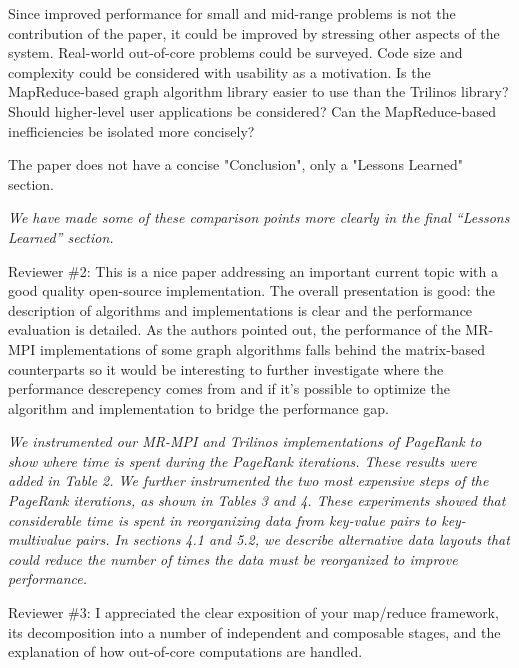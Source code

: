\documentclass[11pt]{article}
\begin{document}
Since improved performance for small and mid-range problems is not the
contribution of the paper, it could be improved by stressing other
aspects of the system.  Real-world out-of-core problems could be
surveyed.  Code size and complexity could be considered with usability
as a motivation.  Is the MapReduce-based graph algorithm library
easier to use than the Trilinos library?  Should higher-level user
applications be considered?  Can the MapReduce-based inefficiencies be
isolated more concisely?

The paper does not have a concise "Conclusion", only a "Lessons Learned"
section.

{\it We have made some of these comparison points more
clearly in the final ``Lessons Learned'' section.}


\vspace{0.5 in}

Reviewer \#2: This is a nice paper addressing an important current topic
with a good quality open-source implementation.  The overall presentation
is good: the description of algorithms and implementations is clear and the
performance evaluation is detailed. As the authors pointed out, the
performance of the MR-MPI implementations of some graph algorithms falls
behind the matrix-based counterparts so it would be interesting to further
investigate where the performance descrepency comes from and if it's
possible to optimize the algorithm and implementation to bridge the
performance gap.

{\it We instrumented our MR-MPI and Trilinos implementations of
PageRank to show where time is spent during the PageRank iterations.
These results were added in Table 2.  We further instrumented the two
most expensive steps of the PageRank iterations, as shown in Tables 3
and 4.  These experiments showed that considerable time is spent in
reorganizing data from key-value pairs to key-multivalue pairs.  In
sections 4.1 and 5.2, we describe alternative data layouts that could
reduce the number of times the data must be reorganized to improve
performance.}

\vspace{0.5 in}

Reviewer \#3: I appreciated the clear exposition of your map/reduce
framework, its decomposition into a number of independent and composable
stages, and the explanation of how out-of-core computations are handled.
\end{document}
